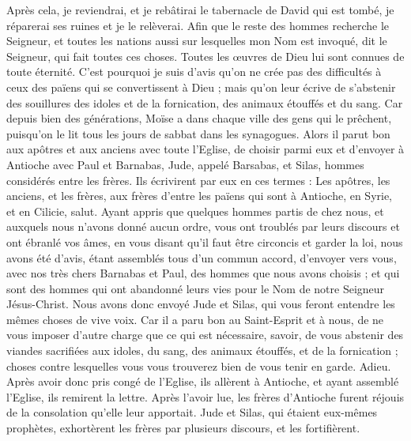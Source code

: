 \begin{multicols}{2}
Après cela, je reviendrai, et je rebâtirai le tabernacle de David qui est tombé, je réparerai ses ruines et je le relèverai.
Afin que le reste des hommes recherche le Seigneur, et toutes les nations aussi sur lesquelles mon Nom est invoqué, dit le Seigneur, qui fait toutes ces choses.
Toutes les œuvres de Dieu lui sont connues de toute éternité.
C'est pourquoi je suis d'avis qu’on ne crée pas des difficultés à ceux des païens qui se convertissent à Dieu ;
mais qu’on leur écrive de s’abstenir des souillures des idoles et de la fornication, des animaux étouffés et du sang.
Car depuis bien des générations, Moïse a dans chaque ville des gens qui le prêchent, puisqu’on le lit tous les jours de sabbat dans les synagogues.
Alors il parut bon aux apôtres et aux anciens avec toute l'Eglise, de choisir parmi eux et d'envoyer à Antioche avec Paul et Barnabas, Jude, appelé Barsabas, et Silas, hommes considérés entre les frères.
Ils écrivirent par eux en ces termes : Les apôtres, les anciens, et les frères, aux frères d'entre les païens qui sont à Antioche, en Syrie, et en Cilicie, salut.
Ayant appris que quelques hommes partis de chez nous, et auxquels nous n’avons donné aucun ordre, vous ont troublés par leurs discours et ont ébranlé vos âmes, en vous disant qu’il faut être circoncis et garder la loi,
nous avons été d'avis, étant assemblés tous d'un commun accord, d'envoyer vers vous, avec nos très chers Barnabas et Paul, des hommes que nous avons choisis ;
et qui sont des hommes qui ont abandonné leurs vies pour le Nom de notre Seigneur Jésus-Christ.
Nous avons donc envoyé Jude et Silas, qui vous feront entendre les mêmes choses de vive voix.
Car il a paru bon au Saint-Esprit et à nous, de ne vous imposer d’autre charge que ce qui est nécessaire,
savoir, de vous abstenir des viandes sacrifiées aux idoles, du sang, des animaux étouffés, et de la fornication ; choses contre lesquelles vous vous trouverez bien de vous tenir en garde. Adieu.
Après avoir donc pris congé de l’Eglise, ils allèrent à Antioche, et ayant assemblé l'Eglise, ils remirent la lettre.
Après l’avoir lue, les frères d’Antioche furent réjouis de la consolation qu’elle leur apportait.
Jude et Silas, qui étaient eux-mêmes prophètes, exhortèrent les frères par plusieurs discours, et les fortifièrent.

\end{multicols}
